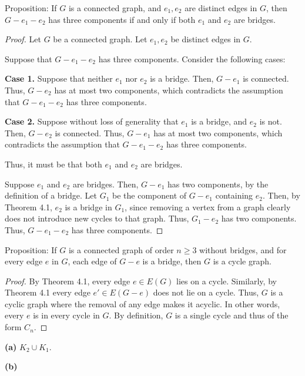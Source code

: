 \documentclass[12pt]{article}
\begin{document}
\newpage{} Proposition: If $G$ is a connected graph, and $e_1, e_2$ are distinct edges in $G$, then $G - e_1 - e_2$ has three components if and only if both $e_1$ and $e_2$ are bridges.
\begin{proof}
    Let $G$ be a connected graph.
    Let $e_1, e_2$ be distinct edges in $G$.

    Suppose that $G - e_1 - e_2$ has three components.
    Consider the following cases:

    {\bf Case 1.} Suppose that neither $e_1$ nor $e_2$ is a bridge.
    Then, $G-e_1$ is connected.
    Thus, $G-e_2$ has at most two components, which contradicts the assumption that $G-e_1-e_2$ has three components.

    {\bf Case 2.} Suppose without loss of generality that $e_1$ is a bridge, and $e_2$ is not.
    Then, $G-e_2$ is connected.
    Thus, $G-e_1$ has at most two components, which contradicts the assumption that $G-e_1-e_2$ has three components.

    Thus, it must be that both $e_1$ and $e_2$ are bridges.

    Suppose $e_1$ and $e_2$ are bridges.
    Then, $G-e_1$ has two components, by the definition of a bridge.
    Let $G_1$ be the component of $G - e_1$ containing $e_2$.
    Then, by Theorem 4.1, $e_2$ is a bridge in $G_1$, since removing a vertex from a graph clearly does not introduce new cycles to that graph. %
    Thus, $G_1 - e_2$ has two components.
    Thus, $G - e_1 - e_2$ has three components.
\end{proof}

\newpage{} Proposition: If $G$ is a connected graph of order $n \geq 3$ without bridges, and for every edge $e$ in $G$, each edge of $G-e$ is a bridge, then $G$ is a cycle graph.
\begin{proof}
By Theorem 4.1, every edge $e \in E(G)$ lies on a cycle. Similarly, by Theorem 4.1 every edge $e' \in E(G - e)$ does not lie on a cycle. Thus, $G$ is a cyclic graph where the removal of any edge makes it acyclic. In other words, every $e$ is in every cycle in $G$. By definition, $G$ is a single cycle and thus of the form $C_n$.
\end{proof}

\newpage{}

{\bf (a)} $K_2 \cup K_1$.

{\bf (b)}
\begin{center}
\end{center}
\end{document}
